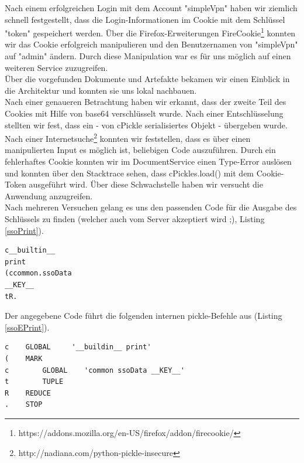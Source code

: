 \documentclass[12pt]{article}
\begin{document}
Nach einem erfolgreichen Login mit dem Account "simpleVpn" haben wir ziemlich schnell festgestellt, dass die Login-Informationen im Cookie mit dem Schlüssel "token" gespeichert werden. Über die Firefox-Erweiterungen FireCookie\footnote{https://addons.mozilla.org/en-US/firefox/addon/firecookie/} konnten wir das Cookie erfolgreich manipulieren und den Benutzernamen von "simpleVpn" auf "admin" ändern. Durch diese Manipulation war es für uns möglich auf einen weiteren Service zuzugreifen. \\
Über die vorgefunden Dokumente und Artefakte bekamen wir einen Einblick in die Architektur und konnten sie uns lokal nachbauen. \\
Nach einer genaueren Betrachtung haben wir erkannt, dass der zweite Teil des Cookies mit Hilfe von base64 verschlüsselt wurde. Nach einer Entschlüsselung stellten wir fest, dass ein - von cPickle serialisiertes Objekt - übergeben wurde. Nach einer Internetsuche\footnote{http://nadiana.com/python-pickle-insecure} konnten wir feststellen, dass es über einen manipulierten Input es möglich ist, beliebigen Code auszuführen. Durch ein fehlerhaftes Cookie konnten wir im DocumentService einen Type-Error auslösen und konnten über den Stacktrace sehen, dass cPickles.load() mit dem Cookie-Token ausgeführt wird. Über diese Schwachstelle haben wir versucht die Anwendung anzugreifen.\\
Nach mehreren Versuchen gelang es uns den passenden Code für die Ausgabe des Schlüssels zu finden (welcher auch vom Server akzeptiert wird ;), Listing \ref{ssoPrint}). 
\begin{lstlisting}[caption={Ausgabe von \_\_KEY\_\_ mit Hilfe von print},label=ssoPrint]
c__builtin__
print
(ccommon.ssoData
__KEY__
tR.
\end{lstlisting}



Der angegebene Code führt die folgenden internen pickle-Befehle aus (Listing \ref{ssoEPrint}). 
\begin{lstlisting}[caption={Erklärung des pickle-Codes},label=ssoEPrint]
c    GLOBAL     '__buildin__ print'
(    MARK
c        GLOBAL    'common ssoData __KEY__'
t        TUPLE      
R    REDUCE
.    STOP
\end{lstlisting}
\end{document}
